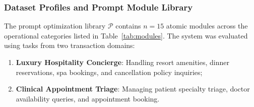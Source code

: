 \documentclass[review,12pt,times,authoryear]{elsarticle}
\theoremstyle{definition}
\begin{document}
\subsubsection{Dataset Profiles and Prompt Module Library}
The prompt optimization library $\mathcal{P}$ contains $n = 15$ atomic modules across the operational categories listed in Table~\ref{tab:modules}. The system was evaluated using tasks from two transaction domains:
\begin{enumerate}[noitemsep]
  \item \textbf{Luxury Hospitality Concierge}: Handling resort amenities, dinner reservations, spa bookings, and cancellation policy inquiries;
  \item \textbf{Clinical Appointment Triage}: Managing patient specialty triage, doctor availability queries, and appointment booking.
\end{enumerate}
\end{document}

